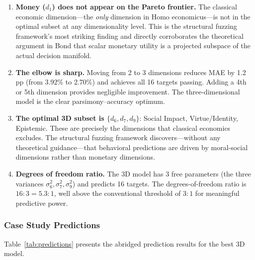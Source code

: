\documentclass[12pt]{article}
\begin{document}
\begin{enumerate}
    \item \textbf{Money ($d_1$) does not appear on the Pareto frontier.}  The classical economic dimension---the \emph{only} dimension in Homo economicus---is not in the optimal subset at any dimensionality level.  This is the structural fuzzing framework's most striking finding and directly corroborates the theoretical argument in Bond \cite{bond2026gecon} that scalar monetary utility is a projected subspace of the actual decision manifold.

    \item \textbf{The elbow is sharp.}  Moving from 2 to 3 dimensions reduces MAE by 1.2 pp (from 3.92\% to 2.70\%) and achieves all 16 targets passing.  Adding a 4th or 5th dimension provides negligible improvement.  The three-dimensional model is the clear parsimony--accuracy optimum.

    \item \textbf{The optimal 3D subset is $\{d_6, d_7, d_9\}$}: Social Impact, Virtue/Identity, Epistemic.  These are precisely the dimensions that classical economics excludes.  The structural fuzzing framework discovers---without any theoretical guidance---that behavioral predictions are driven by moral-social dimensions rather than monetary dimensions.

    \item \textbf{Degrees of freedom ratio.}  The 3D model has 3 free parameters (the three variances $\sigma_6^2, \sigma_7^2, \sigma_9^2$) and predicts 16 targets.  The degrees-of-freedom ratio is $16:3 = 5.3:1$, well above the conventional threshold of $3:1$ for meaningful predictive power.
\end{enumerate}

\subsubsection{Case Study Predictions}

Table~\ref{tab:predictions} presents the abridged prediction results for the best 3D model.
\end{document}
